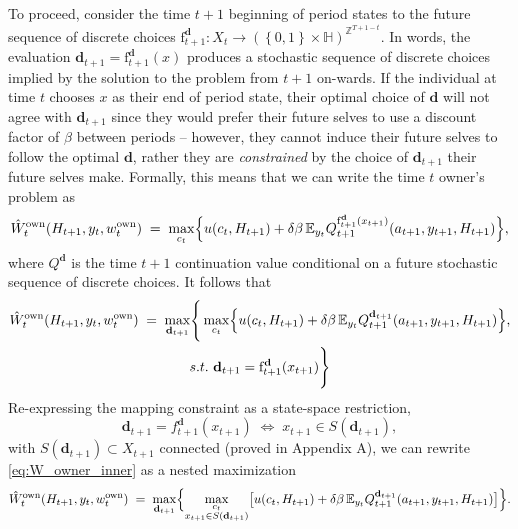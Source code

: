 \documentclass[12pt]{article}
\begin{document}
To proceed, consider the time $t+1$ beginning of period states to the future sequence of discrete choices $\mathrm{f}^{\mathbf{d}}_{t+1}\colon X_{t}\rightarrow \left(\left\{0,1\right\}\times \mathbb{H}\right)^{\mathbb{Z}^{T+1-t}}$. In words, the evaluation $\mathbf{d}_{t+1} = \mathrm{f}^{\mathbf{d}}_{t+1}(x)$ produces a stochastic sequence of discrete choices implied by the solution to the problem from $t+1$ on-wards. If the individual at time $t$ chooses $x$ as their end of period state, their optimal choice of $\mathbf{d}$ will not agree with  $\mathbf{d}_{t+1}$ since they would prefer their future selves to use a discount factor of $\beta$ between periods -- however, they cannot induce their future selves to follow the optimal $\mathbf{d}$, rather they are \emph{constrained} by the choice of  $\mathbf{d}_{t+1}$ their future selves make. Formally, this means that we can write the time $t$ owner's problem as
%
\begin{equation}\label{eq:Bellman_owner_cond}
\hat{W}_{t}^{\text{own}}(H_{t+1},y_{t},w_{t}^{\text{own}})
  \;=\;
  \max_{c_{t}}
  \Bigl\{
    u(c_{t},H_{t+1})
    +\delta\beta\,
     \mathbb{E}_{y_{t}}Q^{\mathrm{f}^{\mathbf{d}}_{t+1}(x_{t+1})}_{t+1}(a_{t+1},y_{t+1},H_{t+1})
  \Bigr\},
\end{equation}
%
where $Q^{\mathbf{d}}$ is the time $t+1$ continuation value conditional on a future stochastic sequence of discrete choices. It follows that 
%
\begin{multline}\label{eq:Bellman_owner_cond}
\hat{W}_{t}^{\text{own}}(H_{t+1},y_{t},w_{t}^{\text{own}})
  \;=\;
  \max_{\mathbf{d}_{t+1}}\Biggr\{\max_{c_{t}}
  \Bigl\{
    u(c_{t},H_{t+1})
    +\delta\beta\,
     \mathbb{E}_{y_{t}}Q^{\mathbf{d}_{t+1}}_{t+1}(a_{t+1},y_{t+1},H_{t+1})
  \Bigr\},\\ s.t. \,\, \mathbf{d}_{t+1} = \mathrm{f}^{\mathbf{d}}_{t+1}(x_{t+1})\Biggr\}
\end{multline}
%
Re-expressing the mapping constraint as a state-space restriction,
%
\begin{equation}
  \mathbf d_{t+1}=f_{t+1}^{\mathbf d}(x_{t+1})
  \;\Longleftrightarrow\;
  x_{t+1}\in S(\mathbf d_{t+1}),
\end{equation}
%
%
with $S(\mathbf d_{t+1})\subset X_{t+1}$ connected (proved in Appendix A), we
can rewrite \eqref{eq:W_owner_inner} as a nested maximization
\begin{align}
  \hat W_{t}^{\text{own}}(H_{t+1},y_{t},w_{t}^{\text{own}})
  \;=\;
  \max_{\mathbf d_{t+1}}
  \Bigl\{
    \max_{\substack{c_{t}\\ x_{t+1}\in S(\mathbf d_{t+1})}}
    \bigl[
      u(c_{t},H_{t+1})
      +\delta\beta\,
       \mathbb E_{y_{t}}
         Q_{t+1}^{\mathbf d_{t+1}}(a_{t+1},y_{t+1},H_{t+1})
    \bigr]
  \Bigr\}.
  \label{eq:W_owner_nested}
\end{align}
%
\end{document}
